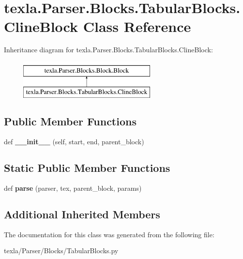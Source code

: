 \hypertarget{classtexla_1_1Parser_1_1Blocks_1_1TabularBlocks_1_1ClineBlock}{}\section{texla.\+Parser.\+Blocks.\+Tabular\+Blocks.\+Cline\+Block Class Reference}
\label{classtexla_1_1Parser_1_1Blocks_1_1TabularBlocks_1_1ClineBlock}
Inheritance diagram for texla.\+Parser.\+Blocks.\+Tabular\+Blocks.\+Cline\+Block\+:\begin{figure}[H]
\begin{center}
\leavevmode
\includegraphics[height=2.000000cm]{classtexla_1_1Parser_1_1Blocks_1_1TabularBlocks_1_1ClineBlock}
\end{center}
\end{figure}
\subsection*{Public Member Functions}
\begin{DoxyCompactItemize}
\item 
\hypertarget{classtexla_1_1Parser_1_1Blocks_1_1TabularBlocks_1_1ClineBlock_aaefc14803bed8851a50098c108c7f982}{}\label{classtexla_1_1Parser_1_1Blocks_1_1TabularBlocks_1_1ClineBlock_aaefc14803bed8851a50098c108c7f982} 
def {\bfseries \+\_\+\+\_\+init\+\_\+\+\_\+} (self, start, end, parent\+\_\+block)
\end{DoxyCompactItemize}
\subsection*{Static Public Member Functions}
\begin{DoxyCompactItemize}
\item 
\hypertarget{classtexla_1_1Parser_1_1Blocks_1_1TabularBlocks_1_1ClineBlock_a7c5c86e1e06bfcb424579f42fb8e65eb}{}\label{classtexla_1_1Parser_1_1Blocks_1_1TabularBlocks_1_1ClineBlock_a7c5c86e1e06bfcb424579f42fb8e65eb} 
def {\bfseries parse} (parser, tex, parent\+\_\+block, params)
\end{DoxyCompactItemize}
\subsection*{Additional Inherited Members}


The documentation for this class was generated from the following file\+:\begin{DoxyCompactItemize}
\item 
texla/\+Parser/\+Blocks/Tabular\+Blocks.\+py\end{DoxyCompactItemize}
